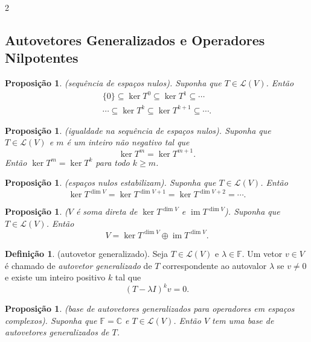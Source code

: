 \documentclass{article}
\theoremstyle{plain}
\newtheorem{prop}[thm]{Proposição}
\theoremstyle{definition}
\newtheorem{defn}{Definição}[section]
\theoremstyle{remark}
\DeclareMathOperator{\im}{im}
\begin{document}
\begin{multicols}{2}
\subsection{Autovetores Generalizados e Operadores Nilpotentes}

\begin{prop} (sequência de espaços nulos).
    Suponha que \(T \in \mathcal{L}(V)\). Então 
    \begin{gather*}
        \{0\} \subseteq \ker T^{0} \subseteq \ker T^1 \subseteq \cdots \\
        \cdots \subseteq \ker T^k \subseteq \ker T^{k+1} \subseteq \cdots .
    \end{gather*}
\end{prop}

\begin{prop} (igualdade na sequência de espaços nulos).
    Suponha que \(T \in \mathcal{L}(V)\) e \(m\) é um inteiro não negativo tal que 
    \[
        \ker T^m = \ker T^{m+1}.
    \]
    \noindent Então \(\ker T^m = \ker T^k\) para todo \(k \geq m\).
\end{prop}

\begin{prop} (espaços nulos estabilizam).
    Suponha que \(T \in \mathcal{L}(V)\). Então 
    \[
        \ker T^{\dim V} = \ker T^{\dim V + 1} = \ker T^{\dim V + 2} = \cdots .
    \]
\end{prop}

\begin{prop} (\(V\) é soma direta de \(\ker T^{\dim V}\) e \(\im T^{\dim V}\)).
    Suponha que \(T \in \mathcal{L}(V)\). Então
    \[
        V = \ker T^{\dim V} \oplus \im T^{\dim V}.
    \]
\end{prop}

\begin{defn} (autovetor generalizado).
    Seja \(T \in \mathcal{L}(V)\) e \(\lambda \in \mathbb{F}\). Um vetor \(v \in V\) é chamado de \emph{autovetor generalizado} de \(T\) correspondente ao autovalor \(\lambda\) se \(v \neq 0\) e existe um inteiro positivo \(k\) tal que
    \[
        (T - \lambda I)^k v = 0.
    \]
\end{defn}

\begin{prop} (base de autovetores generalizados para operadores em espaços complexos).
    Suponha que \(\mathbb{F} = \mathbb{C}\) e \(T \in \mathcal{L}(V)\). Então \(V\) tem uma base de autovetores generalizados de \(T\).
\end{prop}


\end{multicols}
\end{document}
